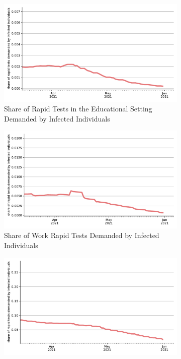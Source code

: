\begin{figure}[ht]
  \centering
  \begin{subfigure}[b]{0.425\textwidth}
    \centering
    \includegraphics[width=\textwidth]{../figures/results/figures/rapid_test_statistics/share_infected_among_educ_demand}
    \caption{Share of Rapid Tests in the Educational Setting Demanded by Infected
    Individuals}
    \label{fig:share_infected_among_educ_rapid_test_demand}
  \end{subfigure}
  \hfill
  \begin{subfigure}[b]{0.425\textwidth}
    \centering
    \includegraphics[width=\textwidth]{../figures/results/figures/rapid_test_statistics/share_infected_among_work_demand}
    \caption{Share of Work Rapid Tests Demanded by Infected Individuals}
    \label{fig:share_infected_among_work_rapid_test_demand}
  \end{subfigure}
  \hfill
  \begin{subfigure}[b]{0.425\textwidth}
    \centering
    \includegraphics[width=\textwidth]{../figures/results/figures/rapid_test_statistics/share_infected_among_private_demand}

\end{subfigure}
\end{figure}
